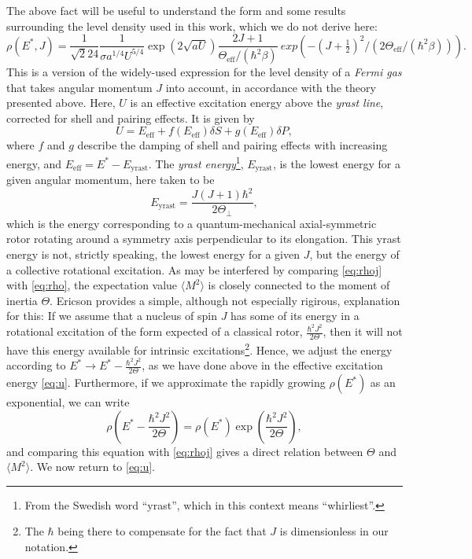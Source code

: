 The above fact will be useful to understand the form and some results surrounding the level density used in this work, which we do not derive here:
\begin{equation}
\rho(E^*,J) = \frac{1}{\sqrt{2}24}
\frac{1}{\sigma a^{1/4} U^{5/4}} \exp{(2\sqrt{aU})}
\frac{2J+1}{\Theta_\text{eff}/(\hbar^2\beta)}\ exp{\left(-(J+\tfrac{1}{2})^2/(2\Theta_\text{eff}/(\hbar^2\beta))\right)}.\label{eq:rho}
\end{equation}
This is a version of the widely-used expression for the level density of a \emph{Fermi gas} that takes angular momentum $J$ into account, in accordance with the theory presented above\cite{ripl:2006}. 
Here, $U$ is an effective excitation energy above the \emph{yrast line}, corrected for shell and pairing effects. It is given by
\begin{equation}
U=E_\text{eff} + f(E_\text{eff})\delta S + g(E_\text{eff})\delta P,\label{eq:u}
\end{equation}
where $f$ and $g$ describe the damping of shell and pairing effects with increasing energy, and $E_\text{eff} = E^*-E_\text{yrast}$. The \emph{yrast energy}\footnote{From the Swedish word ``yrast'', which in this context means ``whirliest''\cite{yrast}.}, $E_\text{yrast}$, is the lowest energy for a given angular momentum, here taken to be
\begin{equation}
E_\text{yrast} = \frac{J(J+1)\hbar^2}{2\Theta_\perp},
\end{equation}
which is the energy corresponding to a quantum-mechanical axial-symmetric rotor rotating around a symmetry axis perpendicular to its elongation. This yrast energy is not, strictly speaking, the lowest energy for a given $J$, but the energy of a collective rotational excitation\cite{ericson:1960}.
As may be interfered by comparing \eqref{eq:rhoj} with \eqref{eq:rho}, the expectation value $\langle M^2 \rangle$ is closely connected to the moment of inertia $\Theta$.
Ericson\cite{ericson:1960} provides a simple, although not especially rigirous, explanation for this:
If we assume that a nucleus of spin $J$ has some of its energy in a rotational excitation of the form expected of a classical rotor, $\frac{\hbar^2J^2}{2\Theta}$, then it will not have this energy available for intrinsic excitations\footnote{The $\hbar$ being there to compensate for the fact that $J$ is dimensionless in our notation.}. Hence, we adjust the energy according to $E^* \to E^* - \frac{\hbar^2J^2}{2\Theta}$, as we have done above in the effective excitation energy \eqref{eq:u}. Furthermore, if we approximate the rapidly growing $\rho(E^*)$ as an exponential, we can write
\begin{equation}
\rho(E^* - \frac{\hbar^2J^2}{2\Theta}) = \rho(E^*) \exp{(\frac{\hbar^2J^2}{2\Theta})},
\end{equation}
and comparing this equation with \eqref{eq:rhoj} gives a direct relation between $\Theta$ and $\langle M^2 \rangle$. We now return to \autoref{eq:u}.
